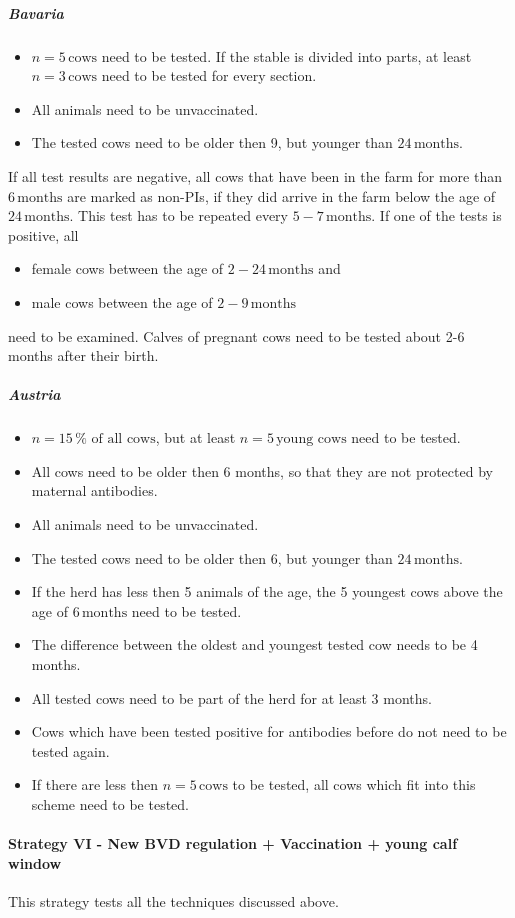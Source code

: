 \subparagraph{Bavaria}
\begin{itemize}
\item $n = 5\,\text{cows}$ need to be tested. If the stable is divided into parts, at least $n = 3\,\text{cows}$ need to be tested for every section. 
\item All animals need to be unvaccinated.
\item The tested cows need to be older then 9, but younger than $24\,\text{months}$.
\end{itemize}
If all test results are negative, all cows that have been in the farm for more than $6\,\text{months}$ are marked as non-PIs, if they did arrive in the farm below the age of $24\,\text{months}$. This test has to be repeated every $5-7\,\text{months}$.
If one of the tests is positive, all 
\begin{itemize}
\item female cows between the age of $2-24\,\text{months}$ and
\item male cows between the age of $2-9\,\text{months}$
\end{itemize}
need to be examined. Calves of pregnant cows need to be tested about 2-6 months after their birth.
\subparagraph{Austria}
\begin{itemize}
\item $n = 15\,\%\text{ of all cows}$, but at least $n = 5\,\text{young cows}$ need to be tested.
\item All cows need to be older then 6 months, so that they are not protected by maternal antibodies.
\item All animals need to be unvaccinated.
\item The tested cows need to be older then 6, but younger than $24\,\text{months}$.
\item If the herd has less then 5 animals of the age, the 5 youngest cows above the age of $6\,\text{months}$  need to be tested.
\item The difference between the oldest and youngest tested cow needs to be 4 months. 
\item All tested cows need to be part of the herd for at least 3 months.
\item Cows which have been tested positive for antibodies before do not need to be tested again.
\item If there are less then $n = 5\,\text{cows}$ to be tested, all cows which fit into this scheme need to be tested.
\end{itemize}
\paragraph{Strategy VI - New BVD regulation + Vaccination + young calf window} 
This strategy tests all the techniques discussed above.
